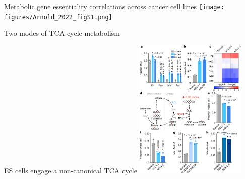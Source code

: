 \documentclass[10pt, aspectratio=169]{beamer}
\begin{document}
\begin{frame}{Metabolic gene essentiality correlations across cancer cell lines}
\centering
\texttt{[image: figures/Arnold\_2022\_figS1.png]}
\end{frame}

\begin{frame}{Two modes of TCA-cycle metabolism}

\begin{figure}
\pause
{}
\end{figure}
	
\end{frame}

\begin{frame}{ES cells engage a non-canonical TCA cycle}
\includegraphics[width=0.4\textwidth]{figures/Arnold_2022_fig2.pdf}
\end{frame}
\end{document}
